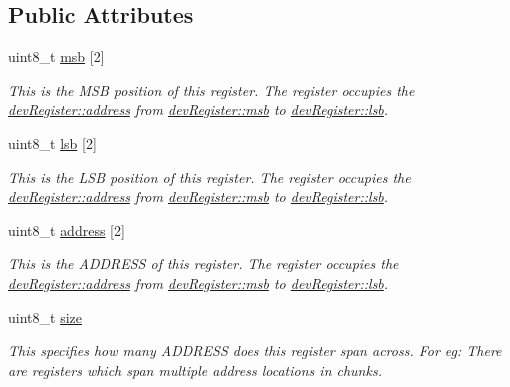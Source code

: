 \subsection*{Public Attributes}
\begin{DoxyCompactItemize}
\item 
uint8\+\_\+t \mbox{\hyperlink{classdev_register_a217b3d5b947f4c596bcdfb4ec175790f}{msb}} \mbox{[}2\mbox{]}
\begin{DoxyCompactList}\small\item\em This is the M\+SB position of this register. The register occupies the \mbox{\hyperlink{classdev_register_ad16fbe9cd26ba1e6d823141976f756da}{dev\+Register\+::address}} from \mbox{\hyperlink{classdev_register_a217b3d5b947f4c596bcdfb4ec175790f}{dev\+Register\+::msb}} to \mbox{\hyperlink{classdev_register_a6908a02139ef85a535848889583e6c12}{dev\+Register\+::lsb}}. \end{DoxyCompactList}\item 
uint8\+\_\+t \mbox{\hyperlink{classdev_register_a6908a02139ef85a535848889583e6c12}{lsb}} \mbox{[}2\mbox{]}
\begin{DoxyCompactList}\small\item\em This is the L\+SB position of this register. The register occupies the \mbox{\hyperlink{classdev_register_ad16fbe9cd26ba1e6d823141976f756da}{dev\+Register\+::address}} from \mbox{\hyperlink{classdev_register_a217b3d5b947f4c596bcdfb4ec175790f}{dev\+Register\+::msb}} to \mbox{\hyperlink{classdev_register_a6908a02139ef85a535848889583e6c12}{dev\+Register\+::lsb}}. \end{DoxyCompactList}\item 
uint8\+\_\+t \mbox{\hyperlink{classdev_register_ad16fbe9cd26ba1e6d823141976f756da}{address}} \mbox{[}2\mbox{]}
\begin{DoxyCompactList}\small\item\em This is the A\+D\+D\+R\+E\+SS of this register. The register occupies the \mbox{\hyperlink{classdev_register_ad16fbe9cd26ba1e6d823141976f756da}{dev\+Register\+::address}} from \mbox{\hyperlink{classdev_register_a217b3d5b947f4c596bcdfb4ec175790f}{dev\+Register\+::msb}} to \mbox{\hyperlink{classdev_register_a6908a02139ef85a535848889583e6c12}{dev\+Register\+::lsb}}. \end{DoxyCompactList}\item 
uint8\+\_\+t \mbox{\hyperlink{classdev_register_a6596e86ccbcd857febb5c28bc03aa480}{size}}
\begin{DoxyCompactList}\small\item\em This specifies how many A\+D\+D\+R\+E\+SS does this register span across. For eg\+: There are registers which span multiple address locations in chunks. \end{DoxyCompactList}\end{DoxyCompactItemize}


